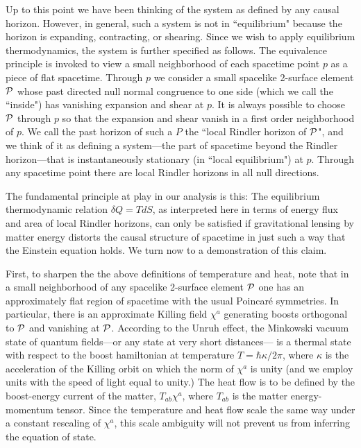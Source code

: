 Up to this point we have been thinking of the system as
defined by any causal horizon. However, in general, such
a system is not in ``equilibrium" because the horizon
is expanding, contracting, or shearing. Since we wish to
apply equilibrium thermodynamics, the system is further
specified as follows. The equivalence principle is invoked to
view a small neighborhood of each spacetime point $p$
as a piece of flat spacetime. Through $p$ we consider a small
spacelike 2-surface element ${\cal P}$ whose past directed
null normal congruence to one side (which we call the ``inside")
has vanishing expansion and shear at $p$.  It is always
possible to choose ${\cal P}$ through $p$ so that the expansion and
shear vanish in a first order neighborhood of $p$. We call
the past horizon of such a $P$ the ``local Rindler horizon of
${\cal P}$", and we think of it as defining a system---the part of
spacetime beyond the Rindler horizon---that is instantaneously
stationary (in ``local equilibrium") at $p$.
Through any spacetime point there are local Rindler horizons in
all null directions.

The fundamental principle at play in our analysis is this:
The equilibrium thermodynamic relation $\delta Q=T dS$,
as interpreted here in terms of energy flux and area of
local Rindler horizons, can only be satisfied if gravitational
lensing by matter energy distorts the causal structure of
spacetime in just such a way that the Einstein equation holds.
We turn now to a demonstration of this claim.

First, to sharpen the the above definitions of temperature and heat,
note that in a small neighborhood of any spacelike 2-surface
element ${\cal P}$ one has an approximately flat
region of spacetime with the usual Poincar\'e symmetries.
In particular, there is an approximate Killing field $\chi^a$
generating boosts orthogonal to ${\cal P}$ and vanishing at ${\cal P}$.
According to the Unruh effect\cite{unruh}, the Minkowski
vacuum state of quantum fields---or any state at very short distances---
is a thermal state with respect to the boost hamiltonian
at temperature $T=\hbar \kappa/2\pi$, where
$\kappa$ is the acceleration of the Killing orbit on which
the norm of $\chi^a$ is unity (and we employ units with the
speed of light equal to unity.) The heat flow is to be defined by the
boost-energy current of the matter, $T_{ab}\chi^a$, where
$T_{ab}$ is the matter energy-momentum tensor.
Since the temperature and heat flow scale the same way under
a constant rescaling of $\chi^a$, this scale ambiguity will
not prevent us from inferring the equation of state.

